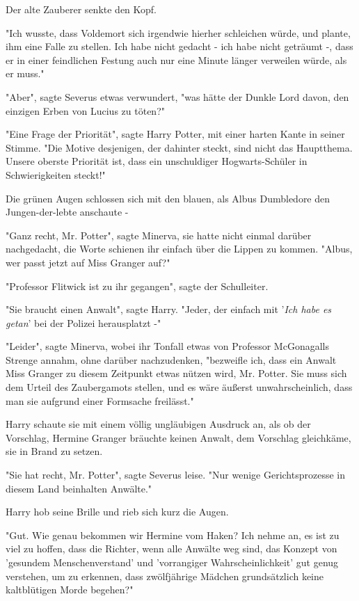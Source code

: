{Der alte Zauberer senkte den Kopf.

"Ich wusste, dass Voldemort sich irgendwie hierher schleichen würde, und plante, ihm eine Falle zu stellen. Ich habe nicht gedacht - ich habe nicht geträumt -, dass er in einer feindlichen Festung auch nur eine Minute länger verweilen würde, als er muss."

"Aber", sagte Severus etwas verwundert, "was hätte der Dunkle Lord davon, den einzigen Erben von Lucius zu töten?"

"Eine Frage der Priorität", sagte Harry Potter, mit einer harten Kante in seiner Stimme. "Die Motive desjenigen, der dahinter steckt, sind nicht das Hauptthema. Unsere oberste Priorität ist, dass ein unschuldiger Hogwarts-Schüler in Schwierigkeiten steckt!"

Die grünen Augen schlossen sich mit den blauen, als Albus Dumbledore den Jungen-der-lebte anschaute -

"Ganz recht, Mr. Potter", sagte Minerva, sie hatte nicht einmal darüber nachgedacht, die Worte schienen ihr einfach über die Lippen zu kommen. "Albus, wer passt jetzt auf Miss Granger auf?"

"Professor Flitwick ist zu ihr gegangen", sagte der Schulleiter.

"Sie braucht einen Anwalt", sagte Harry. "Jeder, der einfach mit '\emph{Ich habe es getan}' bei der Polizei herausplatzt -"

"Leider", sagte Minerva, wobei ihr Tonfall etwas von Professor McGonagalls Strenge annahm, ohne darüber nachzudenken, "bezweifle ich, dass ein Anwalt Miss Granger zu diesem Zeitpunkt etwas nützen wird, Mr. Potter. Sie muss sich dem Urteil des Zaubergamots stellen, und es wäre äußerst unwahrscheinlich, dass man sie aufgrund einer Formsache freilässt."

Harry schaute sie mit einem völlig ungläubigen Ausdruck an, als ob der Vorschlag, Hermine Granger bräuchte keinen Anwalt, dem Vorschlag gleichkäme, sie in Brand zu setzen.

"Sie hat recht, Mr. Potter", sagte Severus leise. "Nur wenige Gerichtsprozesse in diesem Land beinhalten Anwälte."

Harry hob seine Brille und rieb sich kurz die Augen.

"Gut. Wie genau bekommen wir Hermine vom Haken? Ich nehme an, es ist zu viel zu hoffen, dass die Richter, wenn alle Anwälte weg sind, das Konzept von 'gesundem Menschenverstand' und 'vorrangiger Wahrscheinlichkeit' gut genug verstehen, um zu erkennen, dass zwölfjährige Mädchen grundsätzlich keine kaltblütigen Morde begehen?"

}

